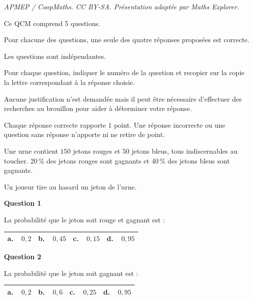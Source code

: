 \documentclass[10pt]{article}
\begin{document}
\noindent\textit{APMEP / CoopMaths. CC BY-SA. Présentation adaptée par Maths Explorer.}\par\medskip
\medskip

Ce QCM comprend 5 questions. 

Pour chacune des questions, une seule des quatre réponses proposées est correcte. 

Les questions sont indépendantes.

Pour chaque question, indiquer le numéro de la question et recopier sur la copie la lettre correspondant à la réponse choisie. 

Aucune justification n'est demandée mais il peut être nécessaire d'effectuer des recherches au brouillon pour aider à déterminer votre réponse.

Chaque réponse correcte rapporte $1$ point. Une réponse incorrecte ou une question sans réponse n'apporte ni ne retire de point.

\bigskip

Une urne contient $150$ jetons rouges et $50$ jetons bleus, tous indiscernables au toucher. 20\,\% des jetons rouges sont gagnants et 40\,\% des jetons bleus sont gagnants.

 Un joueur tire au hasard un jeton de l'urne.

\medskip

\textbf{Question 1}

\medskip

La probabilité que le jeton soit rouge et gagnant est :

\begin{center}
\begin{tabularx}{\linewidth}{|*{4}{X|}}\hline
\textbf{a.~~}$0,2$&\textbf{b.~~}$0,45$&\textbf{c.~~}$0,15$&\textbf{d.~~}$0,95$\\ \hline
\end{tabularx}
\end{center}

\textbf{Question 2}

\medskip

La probabilité que le jeton soit gagnant est :

\begin{center}
\begin{tabularx}{\linewidth}{|*{4}{X|}}\hline
\textbf{a.~~}$0,2$&\textbf{b.~~}$0,6$&\textbf{c.~~}$0,25$&\textbf{d.~~}$0,95$\\ \hline
\end{tabularx}
\end{center}
\end{document}
